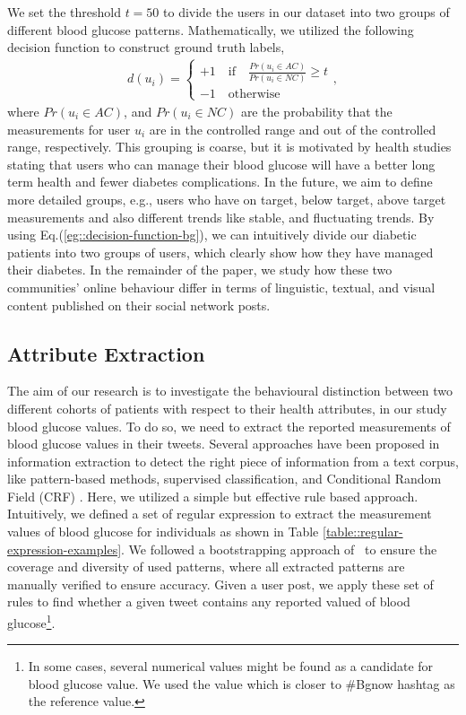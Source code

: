 \documentclass{acm_proc_article-sp}
\begin{document}
We set the threshold $t = 50$ to divide the users in our dataset into two groups of different blood glucose patterns. Mathematically, we utilized the following decision function to construct ground truth labels,
\begin{align}
\label{eg::decision-function-bg}
d(u_i) =
\begin{cases}
+1 \quad \text{if} \quad \frac{Pr(u_i \in AC)}{Pr(u_i \in NC)} \geq t\\
-1 \quad \text{otherwise}
\end{cases},
\end{align}
where $Pr(u_i \in AC)$, and $Pr(u_i \in NC)$ are the probability that the measurements for user $u_i$ are in the controlled range and out of the controlled range, respectively.
This grouping is coarse, but it is motivated by health studies~\cite{franciosi2001impact, malanda2013self} stating that users who can manage their blood glucose will have a better long term health and fewer diabetes complications. In the future, we aim to define more detailed groups, e.g., users who have on target, below target, above target measurements and also different trends like stable, and fluctuating trends.
By using Eq.(\ref{eg::decision-function-bg}), we can intuitively divide our diabetic patients into two groups of users, which clearly show how they have managed their diabetes. In the remainder of the paper, we study how these two communities' online behaviour differ in terms of linguistic, textual, and visual content published on their social network posts.

\subsection{Attribute Extraction}
The aim of our research is to investigate the behavioural distinction between two different cohorts of patients with respect to their health attributes, in our study blood glucose values. To do so, we need to extract the reported measurements of blood glucose values in their tweets. Several approaches have been proposed in information extraction to detect the right piece of information from a text corpus, like pattern-based methods, supervised classification, and Conditional Random Field (CRF) \cite{chang2006survey}. Here, we utilized a simple but effective rule based approach. Intuitively, we defined a set of regular expression to extract the measurement values of blood glucose for individuals as shown in Table \ref{table::regular-expression-examples}. We followed a bootstrapping approach of~\cite{thelen2002bootstrapping} to ensure the coverage and diversity of used patterns, where all extracted patterns are manually verified to ensure accuracy. Given a user post, we apply these set of rules to find whether a given tweet contains any reported valued of blood glucose\footnote{In some cases, several numerical values might be found as a candidate for blood glucose value. We used the value which is closer to \#Bgnow hashtag as the reference value.}.
\end{document}
